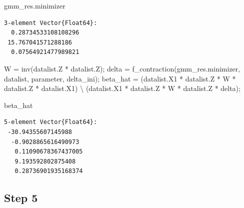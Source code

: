 \documentclass[
  letterpaper,
  DIV=11,
  numbers=noendperiod]{scrreprt}
\newenvironment{Shaded}{\begin{snugshade}}{\end{snugshade}}
\newcommand{\FunctionTok}[1]{\textcolor[rgb]{0.28,0.35,0.67}{#1}}
\newcommand{\NormalTok}[1]{\textcolor[rgb]{0.00,0.23,0.31}{#1}}
\newcommand{\OperatorTok}[1]{\textcolor[rgb]{0.37,0.37,0.37}{#1}}
\begin{document}
\begin{Shaded}
\begin{Highlighting}[]
\NormalTok{gmm\_res.minimizer}
\end{Highlighting}
\end{Shaded}

\begin{verbatim}
3-element Vector{Float64}:
  0.28734533108108296
 15.767041571288186
  0.07564921477989821
\end{verbatim}

\begin{Shaded}
\begin{Highlighting}[]
\NormalTok{W }\OperatorTok{=} \FunctionTok{inv}\NormalTok{(datalist.Z}\OperatorTok{\textquotesingle{}} \OperatorTok{*}\NormalTok{ datalist.Z);    }
\NormalTok{delta }\OperatorTok{=} \FunctionTok{f\_contraction}\NormalTok{(gmm\_res.minimizer, datalist, parameter, delta\_ini);}
\NormalTok{beta\_hat }\OperatorTok{=}\NormalTok{ (datalist.X1}\OperatorTok{\textquotesingle{}} \OperatorTok{*}\NormalTok{ datalist.Z }\OperatorTok{*}\NormalTok{ W }\OperatorTok{*}\NormalTok{ datalist.Z}\OperatorTok{\textquotesingle{}} \OperatorTok{*}\NormalTok{ datalist.X1) }\OperatorTok{\textbackslash{}}\NormalTok{ (datalist.X1}\OperatorTok{\textquotesingle{}} \OperatorTok{*}\NormalTok{ datalist.Z }\OperatorTok{*}\NormalTok{ W }\OperatorTok{*}\NormalTok{ datalist.Z}\OperatorTok{\textquotesingle{}} \OperatorTok{*}\NormalTok{ delta);}

\NormalTok{beta\_hat}
\end{Highlighting}
\end{Shaded}

\begin{verbatim}
5-element Vector{Float64}:
 -30.94355607145988
  -0.9028865616490973
   0.11090678367437005
   9.193592802875408
   0.28736901935168374
\end{verbatim}

\hypertarget{step-5}{%
\subsection{Step 5}\label{step-5}}
\end{document}
